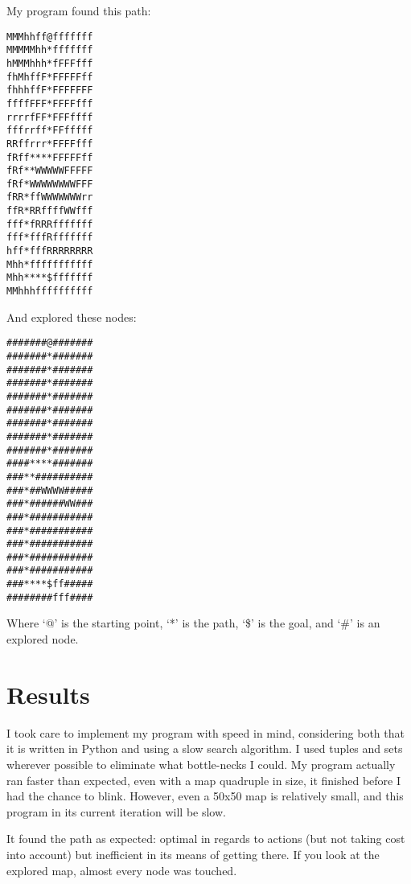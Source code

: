 \documentclass[12pt, letter]{scrartcl}
\begin{document}
My program found this path:
\begin{verbatim}
MMMhhff@fffffff
MMMMMhh*fffffff
hMMMhhh*fFFFfff
fhMhffF*FFFFFff
fhhhffF*FFFFFFF
ffffFFF*FFFFfff
rrrrfFF*FFFffff
fffrrff*FFfffff
RRffrrr*FFFFfff
fRff****FFFFFff
fRf**WWWWWFFFFF
fRf*WWWWWWWWFFF
fRR*ffWWWWWWWrr
ffR*RRffffWWfff
fff*fRRRfffffff
fff*fffRfffffff
hff*fffRRRRRRRR
Mhh*fffffffffff
Mhh****$fffffff
MMhhhffffffffff
\end{verbatim}

And explored these nodes:
\begin{verbatim}
#######@#######
#######*#######
#######*#######
#######*#######
#######*#######
#######*#######
#######*#######
#######*#######
#######*#######
####****#######
###**##########
###*##WWWW#####
###*######WW###
###*###########
###*###########
###*###########
###*###########
###*###########
###****$ff#####
########fff####
\end{verbatim}

Where `@' is the starting point, `*' is the path, `\$' is the goal, and `\#' is an explored node.

\section{Results}
I took care to implement my program with speed in mind, considering both that it is written in Python and using a slow search algorithm. I used tuples and sets wherever possible to eliminate what bottle-necks I could. My program actually ran faster than expected, even with a map quadruple in size, it finished before I had the chance to blink. However, even a 50x50 map is relatively small, and this program in its current iteration will be slow.

It found the path as expected: optimal in regards to actions (but not taking cost into account) but inefficient in its means of getting there. If you look at the explored map, almost every node was touched.
\end{document}
